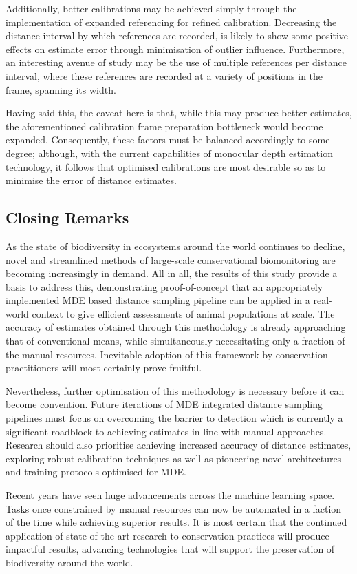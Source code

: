 Additionally, better calibrations may be achieved simply through the implementation of expanded
referencing for refined calibration.
Decreasing the distance interval by which references are recorded, is likely to show some positive
effects on estimate error through minimisation of outlier influence.
Furthermore, an interesting avenue of study may be the use of multiple references per distance
interval, where these references are recorded at a variety of positions in the frame, spanning its
width.

Having said this, the caveat here is that, while this may produce better estimates, the
aforementioned calibration frame preparation bottleneck would become expanded.
Consequently, these factors must be balanced accordingly to some degree; although, with the current
capabilities of monocular depth estimation technology, it follows that optimised calibrations
are most desirable so as to minimise the error of distance estimates.

\subsection{Closing Remarks}

As the state of biodiversity in ecosystems around the world continues to decline, novel
and streamlined methods of large-scale conservational biomonitoring are becoming increasingly
in demand.
All in all, the results of this study provide a basis to address this, demonstrating proof-of-concept
that an appropriately implemented MDE based distance sampling pipeline can be applied in a real-world
context to give efficient assessments of animal populations at scale.
The accuracy of estimates obtained through this methodology is already approaching that of conventional
means, while simultaneously necessitating only a fraction of the manual resources.
Inevitable adoption of this framework by conservation practitioners will most certainly prove fruitful.

Nevertheless, further optimisation of this methodology is necessary before it can become convention.
Future iterations of MDE integrated distance sampling pipelines must focus on overcoming the
barrier to detection which is currently a significant roadblock to achieving estimates in line with
manual approaches.
Research should also prioritise achieving increased accuracy of distance estimates, exploring robust
calibration techniques as well as pioneering novel architectures and training protocols optimised
for MDE\@.

Recent years have seen huge advancements across the machine learning space.
Tasks once constrained by manual resources can now be automated in a faction of the time
while achieving superior results.
It is most certain that the continued application of state-of-the-art research to conservation
practices will produce impactful results, advancing technologies that will support the preservation of
biodiversity around the world.
